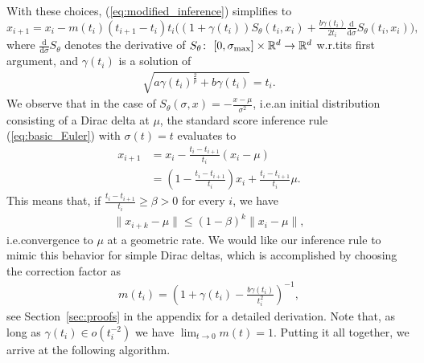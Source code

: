 \documentclass{article}
\newcommand{\R}{\mathbb{R}}
\theoremstyle{plain}
\theoremstyle{definition}
\theoremstyle{remark}
\renewcommand{\d}{\mathrm{d}}
\newcommand{\ddsigma}{\tfrac{\d}{\d\sigma}}
\begin{document}
With these choices, (\ref{eq:modified_inference}) simplifies to 
\begin{equation}\label{eq:modified_inference2}
    x_{i+1} = x_{i}- m(t_i)(t_{i+1}-t_i)t_i \big((1+\gamma(t_i))S_\theta(t_i,x_i)+\tfrac{b\gamma(t_i)}{2t_i}\ddsigma S_\theta(t_i,x_i)\big),
\end{equation}
where $\ddsigma S_\theta$ denotes the derivative of $S_\theta\colon\ [0,\sigma_{\rm max}]\times \R^d\to\R^d$ w.r.t\@ its first argument, and $\gamma(t_i)$ is a solution of
\begin{align*}
    \sqrt{a\gamma(t_i)^{\frac{2}{p}}+b\gamma(t_i)}=t_i.
\end{align*}
We observe that in the case of $S_\theta(\sigma,x)=-\tfrac{x-\mu}{\sigma^2}$, i.e.\@ an initial distribution consisting of a Dirac delta at $\mu$,
the standard score inference rule (\ref{eq:basic_Euler}) with $\sigma(t)=t$ evaluates to 
\begin{equation}
\begin{split}
    \label{eq:standard_score_Dirac}
    x_{i+1}&=x_i - \tfrac{t_i-t_{i+1}}{t_i}(x_i-\mu)\\&=(1-\tfrac{t_i-t_{i+1}}{t_i})x_i + \tfrac{t_i-t_{i+1}}{t_i}\mu .
    \end{split}
\end{equation}
This means that, if $\tfrac{t_i-t_{i+1}}{t_i}\ge \beta>0$ for every $i$, we have
\begin{align*}
    \|x_{i+k} -\mu\|\leq(1-\beta)^k\|x_i-\mu\|,
\end{align*}
i.e.\@ convergence to $\mu$ at a geometric rate. We would like our inference rule to mimic this behavior for simple Dirac deltas, which is accomplished by choosing the correction factor as
\begin{align}\label{eq:correction_factor}
    m(t_i)
=\left(1+\gamma(t_i)-\tfrac{b\gamma(t_i)}{t_i^2}\right)^{-1},
\end{align}
see Section~\ref{sec:proofs} in the appendix for a detailed derivation.
Note that, as long as $\gamma(t_i)\in o(t_i^{-2})$ we have $\lim_{t\to 0}m(t)=1$. Putting it all together, we arrive at the following algorithm.
\end{document}
